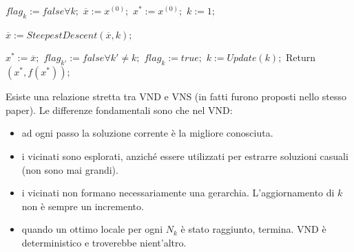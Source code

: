 \documentclass{article}
\begin{document}
\begin{algorithm}[H]
    \caption{$VariableNeighbourhoodDescent(I,x^{(0)})$}
    \label{alg:vnd}
    \begin{algorithmic}
        \State $flag_k:=false\forall k;$
        \State $\overline{x}:=x^{(0)};$
        \State $x^*:=x^{(0)};$
        \State $k:=1;$

            \State $\overline{x}:=SteepestDescent(\overline{x},k);$

                \State $x^*:=\overline{x};$
                \State $flag_{k'}:=false\forall k'\neq k;$
            \Else
                \State $flag_k:=true;$
            \EndIf
                \State $k:=Update(k);$
        \EndWhile
        \State Return $(x^*,f(x^*));$

    \end{algorithmic}
\end{algorithm}

Esiste una relazione stretta tra VND e VNS (in fatti furono proposti nello stesso paper). Le
differenze fondamentali sono che nel VND:
\begin{itemize}
    \item ad ogni passo la soluzione corrente è la migliore conosciuta.
    \item i vicinati sono esplorati, anziché essere utilizzati per estrarre soluzioni casuali (non sono mai grandi).
    \item i vicinati non formano necessariamente una gerarchia. L'aggiornamento di $k$ non è sempre un incremento.
    \item quando un ottimo locale per ogni $N_k$ è stato raggiunto, termina. VND è deterministico
    e troverebbe nient'altro.
\end{itemize}
\end{document}

